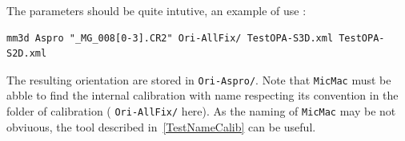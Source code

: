 The parameters should be quite intutive, an example of use :

\begin{verbatim}
mm3d Aspro "_MG_008[0-3].CR2" Ori-AllFix/ TestOPA-S3D.xml TestOPA-S2D.xml 
\end{verbatim}

The resulting orientation are stored in {\tt Ori-Aspro/}. Note that {\tt MicMac} must be abble
to find the internal calibration with name respecting its convention in the folder of calibration
( {\tt Ori-AllFix/}  here). As the naming of {\tt MicMac} may be not obviuous, the tool 
described in~\ref{TestNameCalib} can be useful.







